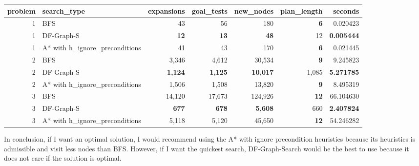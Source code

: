\documentclass[letterpaper]{article}
\begin{document}
\begin{table}[!h]
\begin{tabular}{rlrrrrr}
\toprule
 problem &                     search\_type & expansions & goal\_tests & new\_nodes & plan\_length &    seconds \\
\midrule
       1 &                             BFS &         43 &         56 &       180 &           \textbf{6} &   0.020423 \\
       1 &                      DF-Graph-S &         \textbf{12} &         \textbf{13} &        \textbf{48} &          12 &   \textbf{0.005444} \\
       1 &  A* with h\_ignore\_preconditions &         41 &         43 &       170 &           \textbf{6} &   0.021445 \\
\midrule
       2 &                             BFS &      3,346 &      4,612 &    30,534 &           \textbf{9} &   9.245823 \\
       2 &                      DF-Graph-S &      \textbf{1,124} &      \textbf{1,125} &    \textbf{10,017} &       1,085 &   \textbf{5.271785} \\
       2 &  A* with h\_ignore\_preconditions &      1,506 &      1,508 &    13,820 &           \textbf{9} &   8.495319 \\
\midrule
       3 &                             BFS &     14,120 &     17,673 &   124,926 &          \textbf{12} &  66.104630 \\
       3 &                      DF-Graph-S &        \textbf{677} &        \textbf{678} &     \textbf{5,608} &         660 &   \textbf{2.407824} \\
       3 &  A* with h\_ignore\_preconditions &      5,118 &      5,120 &    45,650 &          \textbf{12} &  54.246282 \\
\bottomrule
\end{tabular}
\end{table}
In conclusion, if I want an optimal solution, I would recommend using the A* with ignore precondition heuristics because its heuristics is admissible and visit less nodes than BFS. However, if I want the quickest search, DF-Graph-Search would be the best to use because it does not care if the solution is optimal.
\end{document}
